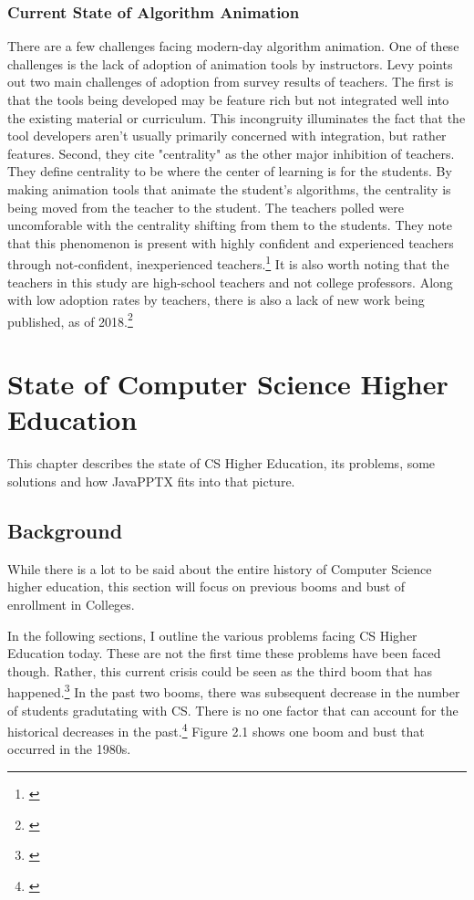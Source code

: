 \documentclass[12pt,twoside]{reedthesis}
\begin{document}
\subsection{Current State of Algorithm Animation}
There are a few challenges facing modern-day algorithm animation. One of these challenges is the lack of adoption of animation tools by instructors. Levy points out two main challenges of adoption from survey results of teachers. The first is that the tools being developed may be feature rich but not integrated well into the existing material or curriculum. This incongruity illuminates the fact that the tool developers aren't usually primarily concerned with integration, but rather features. Second, they cite "centrality" as the other major inhibition of teachers. They define centrality to be 	where the center of learning is for the students. By making animation tools that animate the student's algorithms, the centrality is being moved from the teacher to the student. The teachers polled were uncomforable with the centrality shifting from them to the students. They note that this phenomenon is present with highly confident and experienced teachers through not-confident, inexperienced teachers.\footnote{\cite{levy_we_2007}}  It is also worth noting that the teachers in this study are high-school teachers and not college professors. Along with low adoption rates by teachers, there is also a lack of new work being published, as of 2018.\footnote{\cite{kucera_visualization_2018}}  


\chapter{State of Computer Science Higher Education}	
This chapter describes the state of CS Higher Education, its problems, some solutions and how JavaPPTX fits into that picture.

\section{Background}
While there is a lot to be said about the entire history of Computer Science higher education, this section will focus on previous booms and bust of enrollment in Colleges. 

In the following sections, I outline the various problems facing CS Higher Education today. These are not the first time these problems have been faced though. Rather, this current crisis could be seen as the third boom that has happened.\footnote{\cite{roberts_history}} In the past two booms, there was subsequent decrease in the number of students gradutating with CS. There is no one factor that can account for the historical decreases in the past.\footnote{\cite{committee_on_the_growth_of_computer_science_undergraduate_enrollments_assessing_2018}}   Figure 2.1 shows one boom and bust that occurred in the 1980s. 
\end{document}
